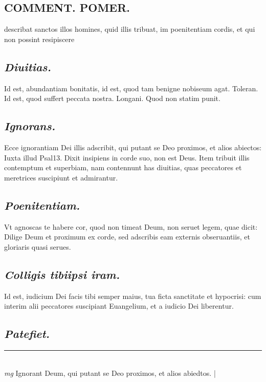 \documentclass{article}
\begin{document}
\begin{pages}
\section*{COMMENT. POMER.  }\pstart describat sanctos illos homines, quid illis tribuat, im poenitentiam cordis, et qui non possint resipiscere\pend
{}
{}
\subsection*{\textit{Diuitias. }}\pstart Id est, abundantiam bonitatis, id est, quod tam benigne nobiseum agat. Toleran. Id est, quod suffert peccata nostra. Longani. Quod non statim punit.   \pend
{}
{}
\subsection*{\textit{Ignorans. }}\pstart Ecce ignorantiam Dei illis adscribit, qui putant se Deo proximos, et alios abiectos: Iuxta illud Psal13. Dixit insipiens in corde suo, non est Deus. Item tribuit illis contemptum et superbiam, nam contennunt has diuitias, quas peccatores et meretrices suscipiunt et admirantur.   \pend
{}
{}
\subsection*{\textit{Poenitentiam. }}\pstart Vt agnoscas te habere cor, quod non timeat Deum, non seruet legem, quae dicit: Dilige Deum et proximum ex corde, sed adscribis eam externis obseruantiis, et gloriaris quasi serues.   \pend
{}
{}
\subsection*{\textit{Colligis tibiipsi iram. }}\pstart Id est, iudicium Dei facis tibi semper maius, tua ficta sanctitate et hypocrisi: cum interim alii peccatores suscipiant Euangelium, et a iudicio Dei liberentur.   \pend
{}
{}
\subsection*{\textit{Patefiet. }}
\vspace{0.5cm}\noindent
\vspace{0.2cm}\rule{1cm}{0.2pt}\\ 
\hspace{0.2cm}\textit{mg}
\footnotesize Ignorant Deum, qui putant se Deo proximos, et alios abiedtos.  
\normalsize| 

\end{pages}
\end{document}
